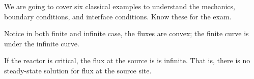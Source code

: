 \documentclass{school-22.211-notes}
\date{April  4, 2012}
\begin{document}
\maketitle

We are going to cover six classical examples to understand the mechanics, boundary conditions, and interface conditions. Know these for the exam. 








Notice in both finite and infinite case, the fluxes are convex; the finite curve is under the infinite curve. 






If the reactor is critical, the flux at the source is is infinite. That is, there is no steady-state solution for flux at the source site. 









\end{document}
